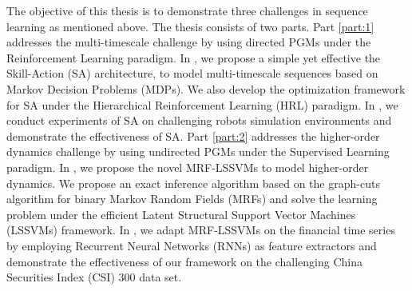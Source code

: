 The objective of this thesis is to demonstrate three challenges
in sequence learning as mentioned above. The thesis consists of
two parts. Part \ref{part:1} addresses the multi-timescale
challenge by using directed PGMs under the Reinforcement Learning
paradigm. In , we propose a simple yet effective
the Skill-Action (SA) architecture, to model multi-timescale
sequences based on Markov Decision Problems (MDPs). We also
develop the optimization framework for SA under the Hierarchical
Reinforcement Learning (HRL) paradigm. In ,
we conduct experiments of SA on challenging robots simulation
environments and demonstrate the effectiveness of SA. Part
\ref{part:2} addresses the higher-order dynamics challenge by
using undirected PGMs under the Supervised Learning paradigm. In
, we propose the novel MRF-LSSVMs to model
higher-order dynamics. We propose an exact inference algorithm
based on the graph-cuts algorithm for binary Markov Random Fields
(MRFs) and solve the learning problem under the efficient Latent
Structural Support Vector Machines (LSSVMs) framework. In
, we adapt MRF-LSSVMs on the financial
time series by employing Recurrent Neural Networks (RNNs) as
feature extractors and demonstrate the effectiveness of our
framework on the challenging China Securities Index (CSI) 300
data set.

